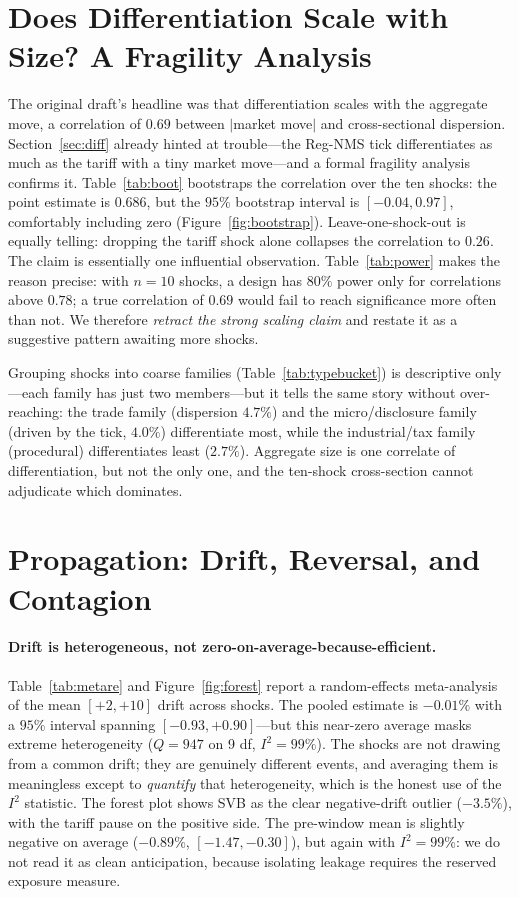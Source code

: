 \documentclass[12pt]{article}
\begin{document}
\section{Does Differentiation Scale with Size? A Fragility Analysis}\label{sec:fragile}
The original draft's headline was that differentiation scales with the aggregate move, a correlation
of $0.69$ between $|$market move$|$ and cross-sectional dispersion. Section~\ref{sec:diff} already
hinted at trouble---the Reg-NMS tick differentiates as much as the tariff with a tiny market
move---and a formal fragility analysis confirms it. Table~\ref{tab:boot} bootstraps the correlation
over the ten shocks: the point estimate is $0.686$, but the $95\%$ bootstrap interval is
$[-0.04,0.97]$, comfortably including zero (Figure~\ref{fig:bootstrap}). Leave-one-shock-out is
equally telling: dropping the tariff shock alone collapses the correlation to $0.26$. The claim is
essentially one influential observation. Table~\ref{tab:power} makes the reason precise: with $n=10$
shocks, a design has $80\%$ power only for correlations above $0.78$; a true correlation of $0.69$
would fail to reach significance more often than not. We therefore \emph{retract the strong scaling
claim} and restate it as a suggestive pattern awaiting more shocks.

Grouping shocks into coarse families (Table~\ref{tab:typebucket}) is descriptive only---each family
has just two members---but it tells the same story without over-reaching: the trade family
(dispersion $4.7\%$) and the micro/disclosure family (driven by the tick, $4.0\%$) differentiate
most, while the industrial/tax family (procedural) differentiates least ($2.7\%$). Aggregate size is
one correlate of differentiation, but not the only one, and the ten-shock cross-section cannot
adjudicate which dominates.

\section{Propagation: Drift, Reversal, and Contagion}\label{sec:prop}
\paragraph{Drift is heterogeneous, not zero-on-average-because-efficient.} Table~\ref{tab:metare}
and Figure~\ref{fig:forest} report a random-effects meta-analysis of the mean $[+2,+10]$ drift
across shocks. The pooled estimate is $-0.01\%$ with a $95\%$ interval spanning
$[-0.93,+0.90]$---but this near-zero average masks extreme heterogeneity ($Q=947$ on 9 df, $I^2=99\%$).
The shocks are not drawing from a common drift; they are genuinely different events, and averaging
them is meaningless except to \emph{quantify} that heterogeneity, which is the honest use of the
$I^2$ statistic. The forest plot shows SVB as the clear negative-drift outlier ($-3.5\%$), with the
tariff pause on the positive side. The pre-window mean is slightly negative on average
($-0.89\%$, $[-1.47,-0.30]$), but again with $I^2=99\%$: we do not read it as clean anticipation,
because isolating leakage requires the reserved exposure measure.
\end{document}
